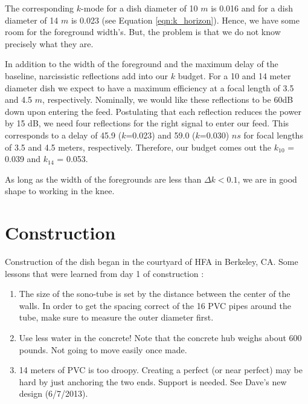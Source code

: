 \documentclass[11pt]{article}
\begin{document}
The corresponding $k$-mode for a dish diameter of 10 $m$ is 0.016 and for a dish
diameter of 14 $m$ is 0.023 (see Equation \ref{eqn:k_horizon}). Hence, we have
some room for the foreground width's. But, the problem is that we do not know
precisely what they are. 

In addition to the width of the foreground and the maximum delay of the
baseline, narcissistic reflections add into our $k$ budget. For a 10 and 14
meter diameter dish we expect to have a maximum efficiency at a focal length of
3.5 and 4.5 $m$, respectively. Nominally, we would like these reflections to be
60dB down upon entering the feed. Postulating that each reflection reduces the
power by 15 dB, we need four reflections for the right signal to enter our feed.
This corresponds to a delay of 45.9 ($k$=0.023)  and 59.0 ($k$=0.030) $ns$ for
focal lengths of 3.5 and 4.5 meters, respectively. Therefore, our budget comes
out the $k_{10}$ = 0.039 and $k_{14}$ = 0.053.

As long as the width of the foregrounds are less than $\Delta k < 0.1$, we are
in good shape to working in the knee. 


\section{Construction}
Construction of the dish began in the courtyard of HFA in Berkeley, CA.
Some lessons that were learned from day 1 of construction :
\begin{enumerate}
    \item{The size of the sono-tube is set by the distance between the center of
the walls. In order to get the spacing correct of the 16 PVC pipes around the
tube, make sure to measure the outer diameter first.}
    \item{Use less water in the concrete! Note that the concrete hub weighs
about 600 pounds. Not going to move easily once made.}
    \item{14 meters of PVC is too droopy. Creating a perfect (or near perfect)
may be hard by just anchoring the two ends. Support is needed. See Dave's new
design (6/7/2013).}
\end{enumerate}
\end{document}
